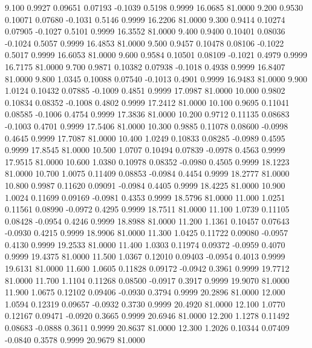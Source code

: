    9.100   0.9927   0.09651   0.07193  -0.1039   0.5198   0.9999  16.0685  81.0000
   9.200   0.9530   0.10071   0.07680  -0.1031   0.5146   0.9999  16.2206  81.0000
   9.300   0.9414   0.10274   0.07905  -0.1027   0.5101   0.9999  16.3552  81.0000
   9.400   0.9400   0.10401   0.08036  -0.1024   0.5057   0.9999  16.4853  81.0000
   9.500   0.9457   0.10478   0.08106  -0.1022   0.5017   0.9999  16.6053  81.0000
   9.600   0.9584   0.10501   0.08109  -0.1021   0.4979   0.9999  16.7175  81.0000
   9.700   0.9871   0.10382   0.07938  -0.1018   0.4938   0.9999  16.8407  81.0000
   9.800   1.0345   0.10088   0.07540  -0.1013   0.4901   0.9999  16.9483  81.0000
   9.900   1.0124   0.10432   0.07885  -0.1009   0.4851   0.9999  17.0987  81.0000
  10.000   0.9802   0.10834   0.08352  -0.1008   0.4802   0.9999  17.2412  81.0000
  10.100   0.9695   0.11041   0.08585  -0.1006   0.4754   0.9999  17.3836  81.0000
  10.200   0.9712   0.11135   0.08683  -0.1003   0.4701   0.9999  17.5406  81.0000
  10.300   0.9885   0.11078   0.08600  -0.0998   0.4645   0.9999  17.7087  81.0000
  10.400   1.0249   0.10833   0.08285  -0.0989   0.4595   0.9999  17.8545  81.0000
  10.500   1.0707   0.10494   0.07839  -0.0978   0.4563   0.9999  17.9515  81.0000
  10.600   1.0380   0.10978   0.08352  -0.0980   0.4505   0.9999  18.1223  81.0000
  10.700   1.0075   0.11409   0.08853  -0.0984   0.4454   0.9999  18.2777  81.0000
  10.800   0.9987   0.11620   0.09091  -0.0984   0.4405   0.9999  18.4225  81.0000
  10.900   1.0024   0.11699   0.09169  -0.0981   0.4353   0.9999  18.5796  81.0000
  11.000   1.0251   0.11561   0.08990  -0.0972   0.4295   0.9999  18.7511  81.0000
  11.100   1.0739   0.11105   0.08428  -0.0954   0.4246   0.9999  18.8988  81.0000
  11.200   1.1361   0.10457   0.07643  -0.0930   0.4215   0.9999  18.9906  81.0000
  11.300   1.0425   0.11722   0.09080  -0.0957   0.4130   0.9999  19.2533  81.0000
  11.400   1.0303   0.11974   0.09372  -0.0959   0.4070   0.9999  19.4375  81.0000
  11.500   1.0367   0.12010   0.09403  -0.0954   0.4013   0.9999  19.6131  81.0000
  11.600   1.0605   0.11828   0.09172  -0.0942   0.3961   0.9999  19.7712  81.0000
  11.700   1.1104   0.11268   0.08500  -0.0917   0.3917   0.9999  19.9070  81.0000
  11.900   1.0675   0.12102   0.09406  -0.0930   0.3794   0.9999  20.2896  81.0000
  12.000   1.0594   0.12319   0.09657  -0.0932   0.3730   0.9999  20.4920  81.0000
  12.100   1.0770   0.12167   0.09471  -0.0920   0.3665   0.9999  20.6946  81.0000
  12.200   1.1278   0.11492   0.08683  -0.0888   0.3611   0.9999  20.8637  81.0000
  12.300   1.2026   0.10344   0.07409  -0.0840   0.3578   0.9999  20.9679  81.0000

